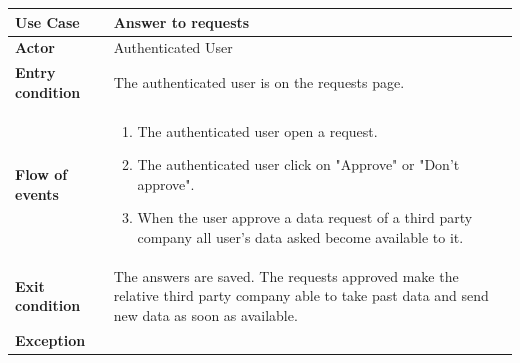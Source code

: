 \documentclass[../main.tex]{subfiles}
\begin{document}
	\vspace*{3cm}
	\begin{center}
		\begin{tabular}{p{3cm}p{8.28cm}}
			\hline
			\textbf{Use Case} & Answer to requests\\
			\hline
			\textbf{Actor} & Authenticated User\\
			\hline
			\textbf{Entry condition} & The authenticated user is on the requests page.\\
			\hline
			\textbf{Flow of events} & \begin{enumerate}
				\linespread{0}\item The authenticated user open a request.
				\linespread{0}\item The authenticated user click on "Approve" or "Don't approve".
				\linespread{0}\item When the user approve a data request of a third party company all user's data asked become available to it.
			\end{enumerate}\\
			\hline
			\textbf{Exit condition} & The answers are saved. The requests approved make the relative third party company able to take past data and send new data as soon as available.\\
			\hline
			\textbf{Exception}\\
			\hline
		\end{tabular}
	\end{center}
	\vspace*{3cm}
\end{document}
